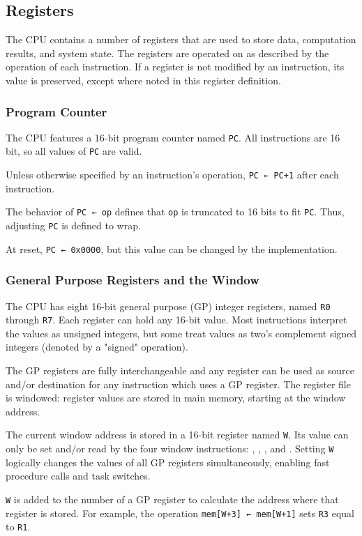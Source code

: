\documentclass[12pt,a4paper]{article}
\begin{document}
\subsection{Registers}
The CPU contains a number of registers that are used to store data, computation results, and system state. The registers are operated on as described by the operation of each instruction. If a register is not modified by an instruction, its value is preserved, except where noted in this register definition.

\subsubsection{Program Counter}
The CPU features a 16-bit program counter named \texttt{PC}. All instructions are 16 bit, so all values of \texttt{PC} are valid.

Unless otherwise specified by an instruction's operation, \texttt{PC ← PC+1} after each instruction.

The behavior of \texttt{PC ← op} defines that \texttt{op} is truncated to 16 bits to fit \texttt{PC}. Thus, adjusting \texttt{PC} is defined to wrap.

At reset, \texttt{PC ← 0x0000}, but this value can be changed by the implementation.

\subsubsection{General Purpose Registers and the Window}
The CPU has eight 16-bit general purpose (GP) integer registers, named \texttt{R0} through \texttt{R7}. Each register can hold any 16-bit value. Most instructions interpret the values as unsigned integers, but some treat values as two's complement signed integers (denoted by a "signed" operation).

The GP registers are fully interchangeable and any register can be used as source and/or destination for any instruction which uses a GP register. The register file is windowed: register values are stored in main memory, starting at the window address.

The current window address is stored in a 16-bit register named \texttt{W}. Its value can only be set and/or read by the four window instructions: , , , and . Setting \texttt{W} logically changes the values of all GP registers simultaneously, enabling fast procedure calls and task switches.

\texttt{W} is added to the number of a GP register to calculate the address where that register is stored. For example, the operation \texttt{mem[W+3] ← mem[W+1]} sets \texttt{R3} equal to \texttt{R1}.
\end{document}
